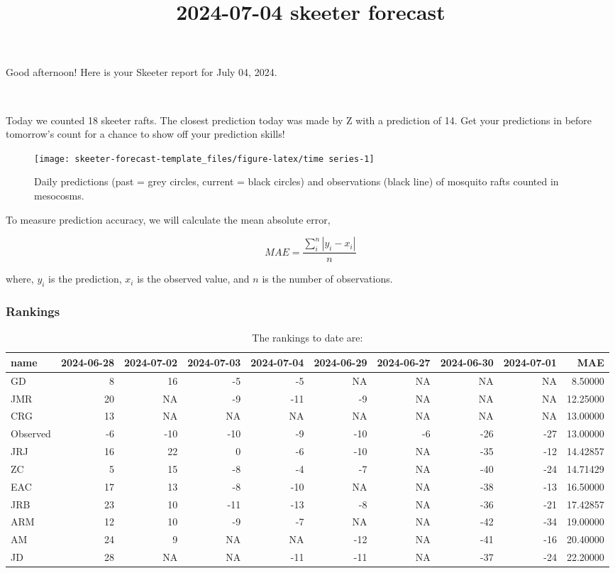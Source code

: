 \documentclass[
]{article}
\title{2024-07-04 skeeter forecast}
\author{}
\date{\vspace{-2.5em}}
\begin{document}
\maketitle

Good afternoon! Here is your Skeeter report for July 04, 2024.

~

Today we counted 18 skeeter rafts. The closest prediction today was made
by Z with a prediction of 14. Get your predictions in before tomorrow's
count for a chance to show off your prediction skills!

\begin{figure}

{\centering \texttt{[image: skeeter-forecast-template\_files/figure-latex/time series-1]} 

}

\caption{Daily predictions (past = grey circles, current = black circles) and observations (black line) of mosquito rafts counted in mesocosms.}\label{fig:time series}
\end{figure}

To measure prediction accuracy, we will calculate the mean absolute
error,

\[MAE = \frac{\sum_{i}^{n}|y_{i} - x_{i}|}{n}\]

where, \(y_i\) is the prediction, \(x_i\) is the observed value, and
\(n\) is the number of observations.

\newpage

\subsubsection{Rankings}\label{rankings}

\begin{longtable}[t]{lrrrrrrrrr}
\caption{\label{tab:rankings table}The rankings to date are:}\\
\toprule
name & 2024-06-28 & 2024-07-02 & 2024-07-03 & 2024-07-04 & 2024-06-29 & 2024-06-27 & 2024-06-30 & 2024-07-01 & MAE\\
\midrule
GD & 8 & 16 & -5 & -5 & NA & NA & NA & NA & 8.50000\\
JMR & 20 & NA & -9 & -11 & -9 & NA & NA & NA & 12.25000\\
CRG & 13 & NA & NA & NA & NA & NA & NA & NA & 13.00000\\
Observed & -6 & -10 & -10 & -9 & -10 & -6 & -26 & -27 & 13.00000\\
JRJ & 16 & 22 & 0 & -6 & -10 & NA & -35 & -12 & 14.42857\\
\addlinespace
ZC & 5 & 15 & -8 & -4 & -7 & NA & -40 & -24 & 14.71429\\
EAC & 17 & 13 & -8 & -10 & NA & NA & -38 & -13 & 16.50000\\
JRB & 23 & 10 & -11 & -13 & -8 & NA & -36 & -21 & 17.42857\\
ARM & 12 & 10 & -9 & -7 & NA & NA & -42 & -34 & 19.00000\\
AM & 24 & 9 & NA & NA & -12 & NA & -41 & -16 & 20.40000\\
\addlinespace
JD & 28 & NA & NA & -11 & -11 & NA & -37 & -24 & 22.20000\\
\bottomrule
\end{longtable}
\end{document}
